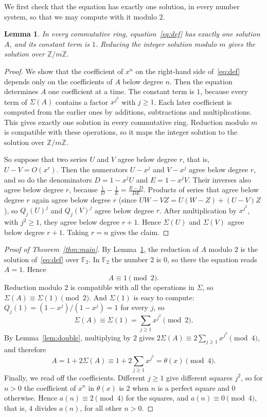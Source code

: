 \documentclass[11pt,a4paper]{article}
\newtheorem{lemma}[theorem]{Lemma}
\theoremstyle{definition}
\theoremstyle{remark}
\newcommand{\Z}{\mathbb{Z}}
\newcommand{\F}{\mathbb{F}}
\begin{document}
We first check that the equation has exactly one solution, in every number system, so that we may compute with it
modulo $2$.

\begin{lemma}\label{lem:exist}
In every commutative ring, equation~\eqref{eq:def} has exactly one solution $A$, and its constant term is $1$.
Reducing the integer solution modulo $m$ gives the solution over $\Z/m\Z$.
\end{lemma}

\begin{proof}
We show that the coefficient of $x^n$ on the right-hand side of~\eqref{eq:def} depends only on the coefficients of $A$
below degree $n$. Then the equation determines $A$ one coefficient at a time. The constant term is $1$, because every
term of $\Sigma(A)$ contains a factor $x^{j^2}$ with $j\ge1$. Each later coefficient is computed from the earlier ones
by additions, subtractions and multiplications. This gives exactly one solution in every commutative ring. Reduction
modulo $m$ is compatible with these operations, so it maps the integer solution to the solution over $\Z/m\Z$.

So suppose that two series $U$ and $V$ agree below degree $r$, that is, $U-V=O(x^r)$. Then the numerators $U-x^j$ and
$V-x^j$ agree below degree $r$, and so do the denominators $D=1-x^jU$ and $E=1-x^jV$. Their inverses also agree below
degree $r$, because $\frac1D-\frac1E=\frac{E-D}{DE}$. Products of series that agree below degree $r$ again agree below
degree $r$ (since $UW-VZ=U(W-Z)+(U-V)Z$), so $Q_j(U)^j$ and $Q_j(V)^j$ agree below degree $r$. After multiplication by
$x^{j^2}$, with $j^2\ge1$, they agree below degree $r+1$. Hence $\Sigma(U)$ and $\Sigma(V)$ agree below degree $r+1$.
Taking $r=n$ gives the claim.
\end{proof}

\begin{proof}[Proof of Theorem~\ref{thm:main}]
By Lemma~\ref{lem:exist}, the reduction of $A$ modulo $2$ is the solution of~\eqref{eq:def} over $\F_2$. In $\F_2$ the
number $2$ is $0$, so there the equation reads $A=1$. Hence
\[
A\equiv1\pmod 2 .
\]
Reduction modulo $2$ is compatible with all the operations in $\Sigma$, so $\Sigma(A)\equiv\Sigma(1)\pmod2$. And
$\Sigma(1)$ is easy to compute: $Q_j(1)=(1-x^j)/(1-x^j)=1$ for every $j$, so
\[
\Sigma(A)\equiv\Sigma(1)=\sum_{j\ge1}x^{j^2}\pmod 2 .
\]
By Lemma~\ref{lem:double}, multiplying by $2$ gives $2\Sigma(A)\equiv2\sum_{j\ge1}x^{j^2}\pmod4$, and therefore
\[
A=1+2\Sigma(A)\equiv1+2\sum_{j\ge1}x^{j^2}=\theta(x)\pmod 4 .
\]
Finally, we read off the coefficients. Different $j\ge1$ give different squares $j^2$, so for $n>0$ the coefficient of
$x^n$ in $\theta(x)$ is $2$ when $n$ is a perfect square and $0$ otherwise. Hence $a(n)\equiv2\pmod4$ for the squares,
and $a(n)\equiv0\pmod4$, that is, $4$ divides $a(n)$, for all other $n>0$.
\end{proof}
\end{document}

